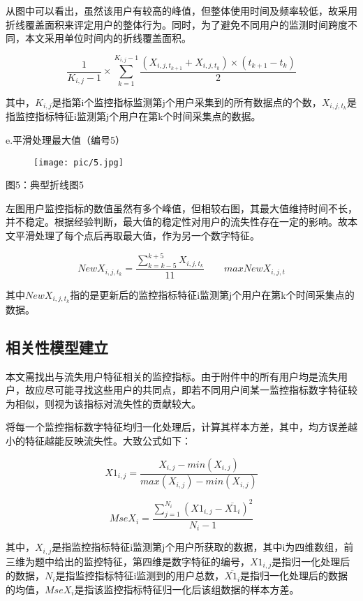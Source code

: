 \documentclass{ctexart}
\begin{document}
    从图中可以看出，虽然该用户有较高的峰值，但整体使用时间及频率较低，故采用折线覆盖面积来评定用户的整体行为。同时，为了避免不同用户的监测时间跨度不同，本文采用单位时间内的折线覆盖面积。

    \[
        \frac{1}{K_{i,j}-1} \times \sum_{k=1}^{K_{i,j}-1}\frac{(X_{i,j,t_{k+1}}+X_{i,j,t_k})\times (t_{k+1}-t_k)}{2}
    \]

    其中，$K_{i,j}$是指第i个监控指标监测第j个用户采集到的所有数据点的个数，$X_{i,j,t_k}$是指监控指标特征i监测第j个用户在第k个时间采集点的数据。

    e.平滑处理最大值（编号5）

    \begin{center}
        \begin{figure}[H]
            \begin{center}
                \texttt{[image: pic/5.jpg]}
            \end{center}
        \end{figure}
        图5：典型折线图5
    \end{center}

    左图用户监控指标的数值虽然有多个峰值，但相较右图，其最大值维持时间不长，并不稳定。根据经验判断，最大值的稳定性对用户的流失性存在一定的影响。故本文平滑处理了每个点后再取最大值，作为另一个数字特征。
    
    \[
        NewX_{i,j,t_k}=\frac{\sum_{k=k-5}^{k+5}X_{i,j,t_k}}{11}  \qquad  max{NewX_{i,j,t}}
    \]

    其中$NewX_{i,j,t_k}$指的是更新后的监控指标特征i监测第j个用户在第k个时间采集点的数据。

    \subsection{相关性模型建立}

    本文需找出与流失用户特征相关的监控指标。由于附件中的所有用户均是流失用户，故应尽可能寻找这些用户的共同点，即若不同用户间某一监控指标数字特征较为相似，则视为该指标对流失性的贡献较大。

    将每一个监控指标数字特征均归一化处理后，计算其样本方差，其中，均方误差越小的特征越能反映流失性。大致公式如下：

    \[
        X1_{i,j}=\frac{X_{i,j}-min(X_{i,j})}{max(X_{i,j})-min(X_{i,j})}
    \]

    \[
        MseX_i=\frac{\sum_{j=1}^{N_i}(X1_{i,j}-\overline{X1_{i}})^2}{N_i-1}
    \]

    其中，$X_{i,j}$是指监控指标特征i监测第j个用户所获取的数据，其中i为四维数组，前三维为题中给出的监控特征，第四维是数字特征的编号，$X1_{i,j}$是指归一化处理后的数据，$N_i$是指监控指标特征i监测到的用户总数，$\overline{X1_{i}}$是指归一化处理后的数据的均值，$MseX_i$是指该监控指标特征归一化后该组数据的样本方差。
\end{document}
